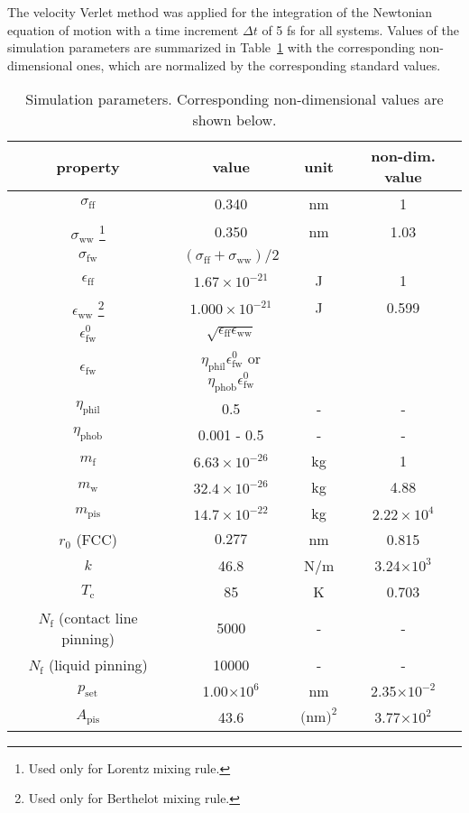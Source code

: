 The velocity Verlet method was applied for the integration of the Newtonian equation of motion 
with a time increment $\Delta t$ of 5 fs for all systems. 
Values of the simulation parameters are summarized in Table~\ref{tab:table1} with the corresponding non- dimensional ones, 
which are normalized by the corresponding standard values.  

\begin{table}[!t]
\caption{\label{tab:table1} 
Simulation parameters. Corresponding non-dimensional values
are shown below.
}
\begin{ruledtabular}
\begin{tabular}{cccc}
property  & value & unit & non-dim. value
\\ \hline
$\sigma_\mathrm{ff}$ & 0.340 & nm & 1
\\
$\sigma_\mathrm{ww}$ 
\footnote{Used only for Lorentz mixing rule.}
& 0.350 & nm & 1.03 
\\
$\sigma_\mathrm{fw}$ & $(\sigma_\mathrm{ff} + \sigma_\mathrm{ww})/2$ 

\\
$\epsilon_\mathrm{ff}$ & $1.67 \times 10^{-21}$ & J & 1
\\
$\epsilon_\mathrm{ww}$ 
\footnote{Used only for Berthelot mixing rule.}
& $1.000\times 10^{-21}$ & J & 0.599
\\
$\epsilon^{0}_\mathrm{fw}$ & 
$ \sqrt{\epsilon_\mathrm{ff}\epsilon_\mathrm{ww}}$
\\
$\epsilon_\mathrm{fw}$ & 
$ \eta_{\text{phil}} \epsilon^{0}_\mathrm{fw}$ or $\eta_{\text{phob}} \epsilon^{0}_\mathrm{fw}$
\\
$\eta_{\text{phil}}$ &
0.5& - & -
\\
$\eta_{\text{phob}}$ &
0.001 - 0.5& - & -
\\
$m_\mathrm{f}$ & $6.63 \times 10^{-26}$ & kg & 1
\\
$m_\mathrm{w}$ & $32.4\times 10^{-26}$ & kg & 4.88
\\
$m_{\text{pis}}$ & $14.7\times 10^{-22}$ & kg & $2.22\times10^{4}$
\\
$r_0$ (FCC) & $0.277$ & nm & 0.815
\\
$k$ & 46.8  & N/m & 3.24$\times10^{3}$
\\
$T_\mathrm{c}$ & 85  & K & 0.703
\\
$N_\mathrm{f}$ (contact line pinning) & 5000  & - & -
\\
$N_\mathrm{f}$ (liquid pinning) & 10000 & - & -
\\
$p_\mathrm{set}$ &1.00$\times 10^{6}$ & nm & 2.35$\times10^{-2}$
\\
$A_\mathrm{pis}$ &43.6 & $\text{(nm)}^{2}$ & 3.77$\times10^{2}$
\end{tabular}
\end{ruledtabular}
%
\end{table}
